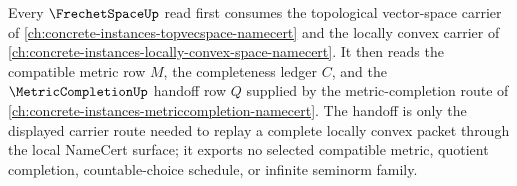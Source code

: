 Every $\FrechetSpaceUp$ read first consumes the topological vector-space carrier of \autoref{ch:concrete-instances-topvecspace-namecert} and the locally convex carrier of \autoref{ch:concrete-instances-locally-convex-space-namecert}. It then reads the compatible metric row $M$, the completeness ledger $C$, and the $\MetricCompletionUp$ handoff row $Q$ supplied by the metric-completion route of \autoref{ch:concrete-instances-metriccompletion-namecert}. The handoff is only the displayed carrier route needed to replay a complete locally convex packet through the local NameCert surface; it exports no selected compatible metric, quotient completion, countable-choice schedule, or infinite seminorm family.
